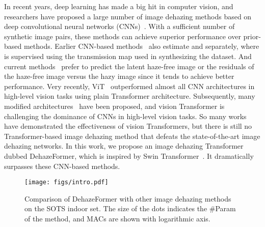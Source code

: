 \documentclass[journal]{IEEEtran}
\begin{document}
In recent years, deep learning has made a big hit in computer vision, and researchers have proposed a large number of image dehazing methods based on deep convolutional neural networks (CNNs)~\cite{cai2016dehazenet,ren2016single,zhang2018densely,li2017aod,ren2018gated,liu2019griddehazenet,chen2019gated,dong2020physics,deng2020hardgan,dong2020multi,qin2020ffa,wu2021contrastive,wang2021eaa,shao2020domain}.
With a sufficient number of synthetic image pairs, these methods can achieve superior performance over prior-based methods.
Earlier CNN-based methods~\cite{cai2016dehazenet,ren2016single,zhang2018densely} also estimate  and  separately, where  is supervised using the transmission map used in synthesizing the dataset.
And current methods~\cite{liu2019griddehazenet,chen2019gated,dong2020physics,deng2020hardgan,qin2020ffa,dong2020multi,wu2021contrastive,wang2021eaa} prefer to predict the latent haze-free image or the residuals of the haze-free image versus the hazy image since it tends to achieve better performance.
Very recently, ViT~\cite{vaswani2017attention} outperformed almost all CNN architectures in high-level vision tasks using plain Transformer architecture.
Subsequently, many modified architectures~\cite{wang2021pyramid,yuan2021tokens,choromanski2020rethinking,xiao2021early,dai2021coatnet,li2022uniformer,park2022vision,liu2021swin,huang2021shuffle,yu2021glance,wang2021crossformer,lin2021cat,chen2021regionvit,chen2021crossvit,chu2021twins,dong2021cswin,wu2021pale,yang2021focal} have been proposed, and vision Transformer is challenging the dominance of CNNs in high-level vision tasks.
So many works have demonstrated the effectiveness of vision Transformers, but there is still no Transformer-based image dehazing method that defeats the state-of-the-art image dehazing networks.
In this work, we propose an image dehazing Transformer dubbed DehazeFormer, which is inspired by Swin Transformer~\cite{liu2021swin}.
It dramatically surpasses these CNN-based methods.

\begin{figure}[t]
    \centering
    \texttt{[image: figs/intro.pdf]}
    \caption{
        Comparison of DehazeFormer with other image dehazing methods on the SOTS indoor set.
        The size of the dots indicates the \#Param of the method, and MACs are shown with logarithmic axis.
    }
    \label{fig:intro}
\end{figure}
\end{document}
